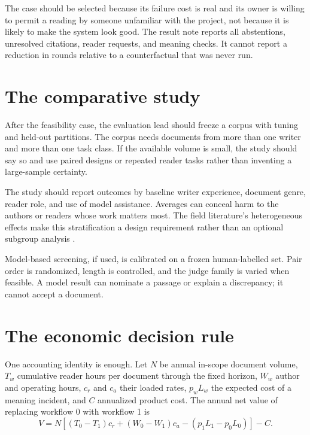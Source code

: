 The case should be selected because its failure cost is real and its owner is
willing to permit a reading by someone unfamiliar with the project, not because
it is likely to make the system look good. The result note reports all abstentions, unresolved
citations, reader requests, and meaning checks. It cannot report a reduction in
rounds relative to a counterfactual that was never run.

\section{The comparative study}

After the feasibility case, the evaluation lead should freeze a corpus with
tuning and held-out partitions. The corpus needs documents from more than one
writer and more than one task class. If the available volume is small, the
study should say so and use paired designs or repeated reader tasks rather than
inventing a large-sample certainty.

The study should report outcomes by baseline writer experience, document genre,
reader role, and use of model assistance. Averages can conceal harm to the
authors or readers whose work matters most. The field literature's
heterogeneous effects make this stratification a design requirement rather than
an optional subgroup analysis \citep{brynjolfsson2025work,dellacqua2026jagged}.

Model-based screening, if used, is calibrated on a frozen human-labelled set.
Pair order is randomized, length is controlled, and the judge family is varied
when feasible. A model result can nominate a passage or explain a discrepancy;
it cannot accept a document.

\section{The economic decision rule}

One accounting identity is enough. Let $N$ be annual in-scope document volume,
$T_w$ cumulative reader hours per document through the fixed horizon, $W_w$
author and operating hours, $c_r$ and $c_a$ their loaded rates, $p_wL_w$ the
expected cost of a meaning incident, and $C$ annualized product cost. The
annual net value of replacing workflow 0 with workflow 1 is
\begin{equation}
  V=N\left[(T_0-T_1)c_r+(W_0-W_1)c_a
    -(p_1L_1-p_0L_0)\right]-C.
  \label{eq:value}
\end{equation}

